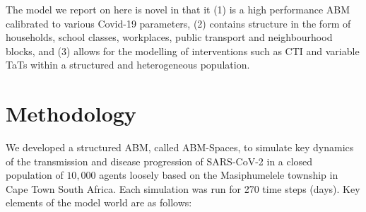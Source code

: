\documentclass{article}
\begin{document}
The model we report on here is novel in that it (1) is a high performance ABM
calibrated to various Covid-19 parameters, (2) contains structure in the form of
households, school classes, workplaces, public transport and neighbourhood
blocks, and (3) allows for the modelling of interventions such as CTI and
variable TaTs within a structured and heterogeneous population.

\section{Methodology}

We developed a structured ABM, called ABM-Spaces, to simulate key dynamics of
the transmission and disease progression of SARS-CoV-2 in a closed population of
$10,000$ agents loosely based on the Masiphumelele township in Cape Town South
Africa. Each simulation was run for 270 time steps (days). Key elements of the
model world are as follows:
\end{document}
